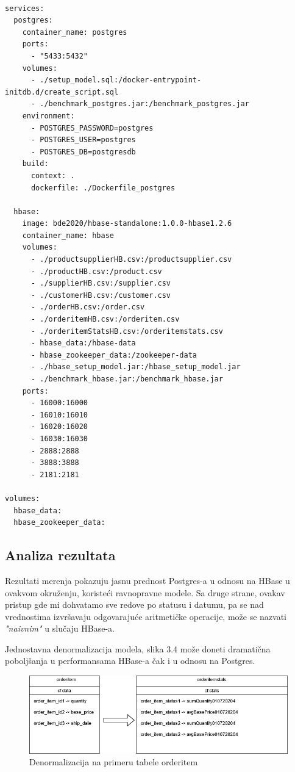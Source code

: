 \documentclass[12pt,oneside]{memoir}
\begin{document}
\begin{lstlisting}[title={docker-compose.yml},captionpos=t]

services: 
  postgres:
    container_name: postgres
    ports:
      - "5433:5432"
    volumes:
      - ./setup_model.sql:/docker-entrypoint-initdb.d/create_script.sql
      - ./benchmark_postgres.jar:/benchmark_postgres.jar
    environment:
      - POSTGRES_PASSWORD=postgres
      - POSTGRES_USER=postgres
      - POSTGRES_DB=postgresdb
    build:
      context: .
      dockerfile: ./Dockerfile_postgres

  hbase:
    image: bde2020/hbase-standalone:1.0.0-hbase1.2.6
    container_name: hbase
    volumes:
      - ./productsupplierHB.csv:/productsupplier.csv
      - ./productHB.csv:/product.csv
      - ./supplierHB.csv:/supplier.csv
      - ./customerHB.csv:/customer.csv
      - ./orderHB.csv:/order.csv
      - ./orderitemHB.csv:/orderitem.csv
      - ./orderitemStatsHB.csv:/orderitemstats.csv
      - hbase_data:/hbase-data
      - hbase_zookeeper_data:/zookeeper-data
      - ./hbase_setup_model.jar:/hbase_setup_model.jar
      - ./benchmark_hbase.jar:/benchmark_hbase.jar
    ports:
      - 16000:16000
      - 16010:16010
      - 16020:16020
      - 16030:16030
      - 2888:2888
      - 3888:3888
      - 2181:2181

volumes:
  hbase_data:
  hbase_zookeeper_data:
\end{lstlisting}


\subsection{Analiza rezultata}

Rezultati merenja pokazuju jasnu prednost Postgres-a u odnosu na HBase u ovakvom okruženju, koristeći ravnopravne modele. Sa druge strane, ovakav pristup gde mi dohvatamo sve redove po statusu i datumu, pa se nad vrednostima izvršavaju odgovarajuće aritmetičke operacije, može se nazvati \textit{"naivnim"} u slučaju HBase-a. 

Jednostavna denormalizacija modela, slika 3.4 može doneti dramatična poboljšanja u performansama HBase-a čak i u odnosu na Postgres.

\begin{figure}[!ht]
  \centering
  \includegraphics[width=1\textwidth]{denormalized-model.png}
  \caption{Denormalizacija na primeru tabele orderitem}
  \label{fig:grafikon}
\end{figure}
\end{document}
